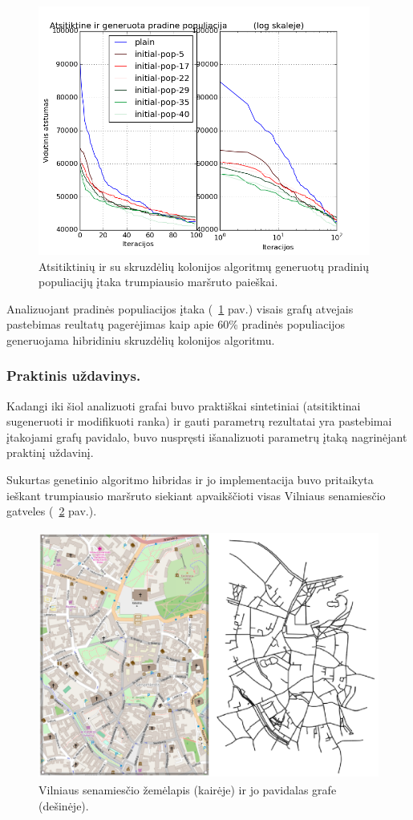 \documentclass[runningheads,a4paper]{llncs}
\begin{document}
\begin{figure}
\centering
\includegraphics[height=8.2cm]{img/pop}
\caption{Atsitiktinių ir su skruzdėlių kolonijos algoritmų generuotų pradinių populiacijų įtaka trumpiausio maršruto paieškai.}
\label{fig:pop}
\end{figure}

Analizuojant pradinės populiacijos įtaka (~\ref{fig:pop} pav.) visais grafų atvejais pastebimas reultatų pagerėjimas kaip apie 60\% pradinės populiacijos generuojama hibridiniu skruzdėlių kolonijos algoritmu.

\subsubsection{Praktinis uždavinys.}

Kadangi iki šiol analizuoti grafai buvo praktiškai sintetiniai (atsitiktinai sugeneruoti ir modifikuoti ranka) ir gauti parametrų rezultatai yra pastebimai įtakojami grafų pavidalo, buvo nuspręsti išanalizuoti parametrų įtaką nagrinėjant praktinį uždavinį.

Sukurtas genetinio algoritmo hibridas ir jo implementacija buvo pritaikyta ieškant trumpiausio maršruto siekiant apvaikščioti visas Vilniaus senamiesčio gatveles (~\ref{fig:vln} pav.).

\begin{figure}
\centering
\includegraphics[height=8.2cm]{img/vln}
\caption{Vilniaus senamiesčio žemėlapis (kairėje) ir jo pavidalas grafe (dešinėje).}
\label{fig:vln}
\end{figure}
\end{document}
